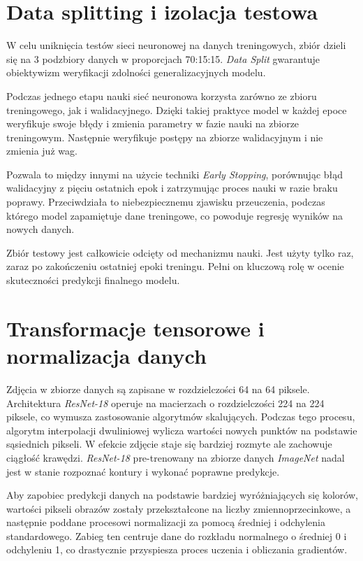 \documentclass[12pt, a4paper]{report}
\begin{document}
\section{Data splitting i izolacja testowa}
\par W celu uniknięcia testów sieci neuronowej na danych treningowych, zbiór dzieli się na 3 podzbiory danych w proporcjach 70:15:15. \emph{Data Split} gwarantuje obiektywizm weryfikacji zdolności generalizacyjnych modelu.
\par Podczas jednego etapu nauki sieć neuronowa korzysta zarówno ze zbioru treningowego, jak i walidacyjnego. Dzięki takiej praktyce model w każdej epoce weryfikuje swoje błędy i zmienia parametry w fazie nauki na zbiorze treningowym. Następnie weryfikuje postępy na zbiorze walidacyjnym i nie zmienia już wag.
\par Pozwala to między innymi na użycie techniki \emph{Early Stopping}, porównując błąd walidacyjny z pięciu ostatnich epok i zatrzymując proces nauki w razie braku poprawy. Przeciwdziała to niebezpiecznemu zjawisku przeuczenia, podczas którego model zapamiętuje dane treningowe, co powoduje regresję wyników na nowych danych.
\par Zbiór testowy jest całkowicie odcięty od mechanizmu nauki. Jest użyty tylko raz, zaraz po zakończeniu ostatniej epoki treningu. Pełni on kluczową rolę w ocenie skuteczności predykcji finalnego modelu.

\section{Transformacje tensorowe i normalizacja danych}
\par Zdjęcia w zbiorze danych są zapisane w rozdzielczości 64 na 64 piksele. Architektura \emph{ResNet-18} operuje na macierzach o rozdzielczości 224 na 224 piksele, co wymusza zastosowanie algorytmów skalujących. \cite{he_resnet} Podczas tego procesu, algorytm interpolacji dwuliniowej wylicza wartości nowych punktów na podstawie sąsiednich pikseli. W efekcie zdjęcie staje się bardziej rozmyte ale zachowuje ciągłość krawędzi. \emph{ResNet-18} pre-trenowany na zbiorze danych \emph{ImageNet} nadal jest w stanie rozpoznać kontury i wykonać poprawne predykcje.
\par Aby zapobiec predykcji danych na podstawie bardziej wyróżniających się kolorów, wartości pikseli obrazów zostały przekształcone na liczby zmiennoprzecinkowe, a następnie poddane procesowi normalizacji za pomocą średniej i odchylenia standardowego. Zabieg ten centruje dane do rozkładu normalnego o średniej 0 i odchyleniu 1, co drastycznie przyspiesza proces uczenia i obliczania gradientów. \cite{leCun_backprop}
\end{document}
